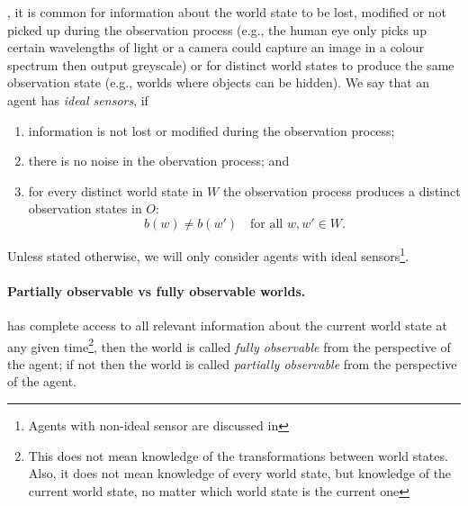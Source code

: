 , it is common for information about the world state to be lost, modified or not picked up during the observation process (e.g., the human eye only picks up certain wavelengths of light or a camera could capture an image in a colour spectrum then output greyscale) or for distinct world states to produce the same observation state (e.g., worlds where objects can be hidden).
We say that an agent has \emph{ideal sensors}, if
\begin{enumerate}
	\item information is not lost or modified during the observation process;
	\item there is no noise in the obervation process; and
	\item for every distinct world state in $W$ the observation process produces a distinct observation states in $O$:
	\begin{equation}
		b(w) \neq b(w') \quad \text{for all $w,w' \in W$}.
	\end{equation}
\end{enumerate}

Unless stated otherwise, we will only consider agents with ideal sensors\footnote{
Agents with non-ideal sensor are discussed in 
}.


\paragraph{Partially observable vs fully observable worlds.}

 has complete access to all relevant information about the current world state at any given time\footnote{
This does not mean knowledge of the transformations between world states.
Also, it does not mean knowledge of every world state, but knowledge of the current world state, no matter which world state is the current one
}, then the world is called \emph{fully observable} from the perspective of the agent; if not then the world is called \emph{partially observable} from the perspective of the agent.

